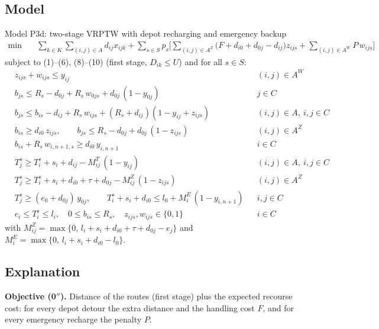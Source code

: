 \documentclass[11pt,a4paper]{article}
\theoremstyle{definition}
\newcommand{\sumk}{\sum_{k\in K}}
\newcommand{\sumA}{\sum_{(i,j)\in A}}
\begin{document}
\subsection{Model}
\begin{modelbox}{Model P3d: two-stage VRPTW with depot recharging and emergency backup}
\vspace{-6pt}
\begin{align*}
\min\quad & \sumk\sumA d_{ij}x_{ijk}+\sum_{s\in S}p_s\Big[\sum_{(i,j)\in A^Z}\big(F+d_{i0}+d_{0j}-d_{ij}\big)z_{ijs}+\sum_{(i,j)\in A^W}P\,w_{ijs}\Big] \tag{0$''$}
\end{align*}
\vspace{-4pt}
subject to (1)--(6), (8)--(10) (first stage, $D_{ik}\le U$) and for all $s\in S$:
\begin{align*}
& z_{ijs}+w_{ijs}\le y_{ij} && (i,j)\in A^W \tag{14}\\
& b_{js}\le R_s-d_{0j}+R_s\,w_{0js}+d_{0j}\,(1-y_{0j}) && j\in C \tag{15}\\
& b_{js}\le b_{is}-d_{ij}+R_s\,w_{ijs}+(R_s+d_{ij})(1-y_{ij}+z_{ijs}) && (i,j)\in A,\ i,j\in C \tag{16}\\
& b_{is}\ge d_{i0}\,z_{ijs},\qquad b_{js}\le R_s-d_{0j}+d_{0j}\,(1-z_{ijs}) && (i,j)\in A^Z \tag{17}\\
& b_{is}+R_s\,w_{i,n+1,s}\ge d_{i0}\,y_{i,n+1} && i\in C \tag{18}\\
& T^s_j\ge T^s_i+s_i+d_{ij}-M^T_{ij}\,(1-y_{ij}) && (i,j)\in A,\ i,j\in C \tag{19}\\
& T^s_j\ge T^s_i+s_i+d_{i0}+\tau+d_{0j}-M^Z_{ij}\,(1-z_{ijs}) && (i,j)\in A^Z \tag{20}\\
& T^s_j\ge (e_0+d_{0j})\,y_{0j},\qquad T^s_i+s_i+d_{i0}\le l_0+M^E_i\,(1-y_{i,n+1}) && i,j\in C \tag{21}\\
& e_i\le T^s_i\le l_i,\quad 0\le b_{is}\le R_s,\quad z_{ijs},w_{ijs}\in\{0,1\} && i\in C \tag{22}
\end{align*}
with $M^Z_{ij}=\max\{0,\,l_i+s_i+d_{i0}+\tau+d_{0j}-e_j\}$ and $M^E_i=\max\{0,\,l_i+s_i+d_{i0}-l_0\}$.
\end{modelbox}

\subsection{Explanation}
\textbf{Objective (0$''$).} Distance of the routes (first stage) plus the expected recourse cost: for every depot detour the extra distance and the handling cost $F$, and for every emergency recharge the penalty $P$.
\end{document}
